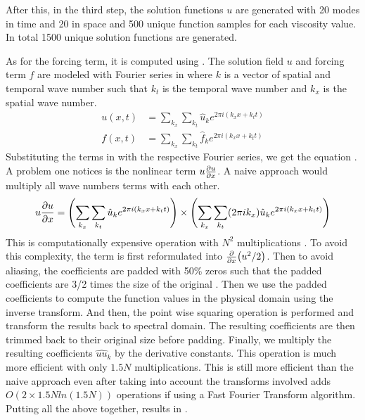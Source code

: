After this, in the third step, the solution functions \(u \) are generated with 20 modes in time and 20 in space and 500 unique function samples for each viscosity value. In total 1500 unique solution functions are generated.

As for the forcing term, it is computed using . The solution field \(u\) and forcing term \(f\) are modeled with Fourier series in  where \(k\) is a vector of spatial and temporal wave number such that \(k_t\) is the temporal wave number and \(k_x\) is the spatial wave number.
\begin{align}
  u\left(x, t \right)           & = \sum_{k_{x}} \sum_{k_{t}} \hat{u}_k e^{2\pi i(k_{x}x+k_{t}t)} \label{eq:fourier_field}        \\
  f\left(x, t \right)           & = \sum_{k_{x}}\sum_{k_{t}} \hat{f}_k e^{2\pi i(k_{x}x+k_{t}t)} \label{eq:fourier_force}
\end{align}
Substituting the terms in  with the respective Fourier series, we get the equation . A problem one notices is the nonlinear term \(u\pdv{u}{x}\). A naive approach would multiply all wave numbers terms with each other.
\begin{align}
  u\pdv{u}{x} = \left(\sum_{k_{x}} \sum_{k_{t}} \hat{u}_k e^{2\pi i(k_{x}x+k_{t}t)}\right) \times \left(\sum_{k_{x}} \sum_{k_{t}} (2\pi i k_{x})\hat{u}_k e^{2\pi i(k_{x}x+k_{t}t)}\right)
\end{align}
This is computationally expensive operation with \(N^2\) multiplications \autocite{lariosMATH934BURGERS2021,robertsDealiasedConvolutionsPseudospectral2011,shenSpectralMethodsAlgorithms2011,orszagComparisonPseudospectralSpectral1972}. To avoid this complexity, the term is first reformulated into \(\pdv{x}(u^2/2)\). Then to avoid aliasing, the coefficients are padded with 50\% zeros such that the padded coefficients are 3/2 times the size of the original \autocite{orszagEliminationAliasingFiniteDifference1971, lariosMATH934BURGERS2021}. Then we use the padded coefficients to compute the function values in the physical domain using the inverse transform. And then, the point wise squaring operation is performed and transform the results back to spectral domain. The resulting coefficients are then trimmed back to their original size before padding. Finally, we multiply the resulting coefficients \(\hat{uu}_k\) by the derivative constants. This operation is much more efficient with only \(1.5 N\) multiplications. This is still more efficient than the naive approach even after taking into account the transforms involved adds \(O(2\times 1.5Nln(1.5N))\) operations if using a Fast Fourier Transform algorithm. Putting all the above together, results in .
